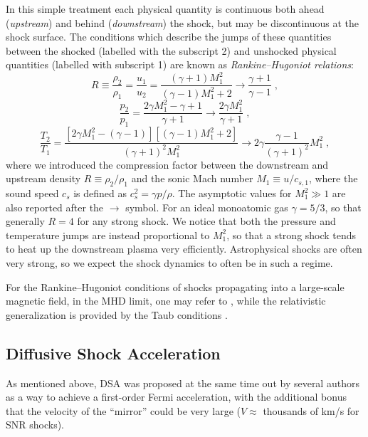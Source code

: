 \documentclass[varenna]{cimento}
\begin{document}
In this simple treatment each physical quantity is continuous both ahead (\emph{upstream}) and behind (\emph{downstream}) the shock, but may be discontinuous at the shock surface. 
The conditions which describe the jumps of these quantities between the shocked (labelled with the subscript 2) and unshocked physical quantities (labelled with subscript 1) are known as \emph{Rankine--Hugoniot relations}:
\begin{equation}
R\equiv\frac{\rho_2}{\rho_1}=\frac{u_1}{u_2}=\frac{(\gamma+1)M_1^2}{(\gamma-1)M_1^2+2}
\to \frac{\gamma+1}{\gamma-1}\;,
\end{equation}
\begin{equation}
	\frac{p_2}{p_1}=\frac{2\gamma M_1^2-\gamma+1}{\gamma+1}
 \to \frac{2\gamma M_1^2}{\gamma+1}\;,
\end{equation}
\begin{equation}
	\frac{T_2}{T_1}=\frac{[2\gamma M_1^2-(\gamma-1)][(\gamma-1)M_1^2+2]}{(\gamma+1)^2M_1^2}
 \to 2\gamma\frac{\gamma-1}{(\gamma+1)^2}M_1^2\;,
\end{equation}
where we introduced the compression factor between the downstream and upstream density $R\equiv\rho_2/\rho_1$ and the sonic Mach number $M_1\equiv u/c_{s,1}$, where the sound speed $c_s$ is defined as $c_s^2= \gamma p/\rho$.
The asymptotic values for $M_1^2\gg 1$ are also reported after the $\to$ symbol. 
For an ideal monoatomic gas $\gamma=5/3$, so that generally $R=4$ for any strong shock. 
We notice that both the pressure and temperature jumps are instead proportional to $M_1^2$, so that a strong shock tends to heat up the downstream plasma very efficiently. 
Astrophysical shocks are often very strong, so we expect the shock dynamics to often be in such a regime.

For the Rankine--Hugoniot conditions of shocks propagating into a large-scale magnetic field, in the MHD limit, one may refer to \cite{jones+91, treumann09}, while the relativistic generalization is provided by the Taub conditions \cite{taub48}.



\subsection{Diffusive Shock Acceleration}\label{tpDSA}
As mentioned above, DSA was proposed at the same time out by several authors \cite{krymskii77,axford+78, blandford+78, bell78a, bell78b} as a way to achieve a first-order Fermi acceleration, with the additional bonus that the velocity of the ``mirror'' could be very large ($V\approx$ thousands of km/s for SNR shocks).
\end{document}

